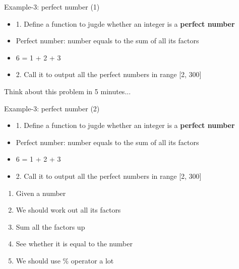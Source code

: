 \begin{frame}[fragile]{Example-3: perfect number (1)}
\begin{itemize}
	\item {1. Define a function to jugde whether an integer is a \textbf{perfect number}}
	\item {Perfect number: number equals to the sum of all its factors}
	\item {6 = 1 + 2 + 3}
	\item {2. Call it to output all the perfect numbers in range [2, 300]}
\end{itemize}
\begin{center}
	\Large{Think about this problem in 5 minutes...}
\end{center}
\end{frame}

\begin{frame}[fragile]{Example-3: perfect number (2)}
\begin{itemize}
	\item {1. Define a function to jugde whether an integer is a \textbf{perfect number}}
	\item {Perfect number: number equals to the sum of all its factors}
	\item {6 = 1 + 2 + 3}
	\item {2. Call it to output all the perfect numbers in range [2, 300]}
\end{itemize}
\begin{enumerate}
	\item {Given a number}
	\item {We should work out all its factors}
	\item {Sum all the factors up}
	\item {See whether it is equal to the number}
	\item {We should use \% operator a lot}
\end{enumerate}
\end{frame}

